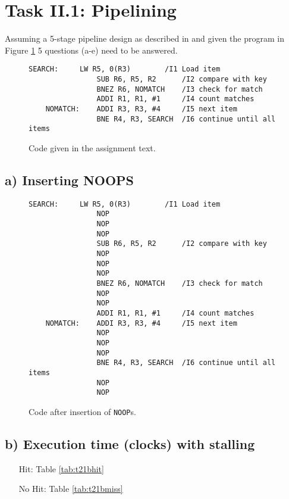 \section{Task II.1: Pipelining}

Assuming a 5-stage pipeline design as described in \cite{l3InOrder} and given
the program in Figure \ref{fig:t21code} 5 questions (a-e) need to be answered.

\begin{figure}[ht]
    \begin{lstlisting}[language={[x86masm]Assembler}]
    SEARCH:     LW R5, 0(R3)        /I1 Load item
                SUB R6, R5, R2      /I2 compare with key
                BNEZ R6, NOMATCH    /I3 check for match
                ADDI R1, R1, #1     /I4 count matches
    NOMATCH:    ADDI R3, R3, #4     /I5 next item
                BNE R4, R3, SEARCH  /I6 continue until all items
    \end{lstlisting}
    \caption{Code given in the assignment text.}
    \label{fig:t21code}
\end{figure}

\subsection{a) Inserting NOOPS}

\begin{figure}[ht]
    \begin{lstlisting}[language={[x86masm]Assembler}]
    SEARCH:     LW R5, 0(R3)        /I1 Load item
                NOP
                NOP
                NOP
                SUB R6, R5, R2      /I2 compare with key
                NOP
                NOP
                NOP
                BNEZ R6, NOMATCH    /I3 check for match
                NOP
                NOP
                ADDI R1, R1, #1     /I4 count matches
    NOMATCH:    ADDI R3, R3, #4     /I5 next item
                NOP
                NOP
                NOP
                BNE R4, R3, SEARCH  /I6 continue until all items
                NOP
                NOP
    \end{lstlisting}
    \caption{Code after insertion of \texttt{NOOP}s.}
    \label{fig:t21a}
\end{figure}

\subsection{b) Execution time (clocks) with stalling}
\begin{itemize}
    \item[Hit: ] Table \ref{tab:t21bhit}

    \item[No Hit: ] Table \ref{tab:t21bmiss}
\end{itemize}


